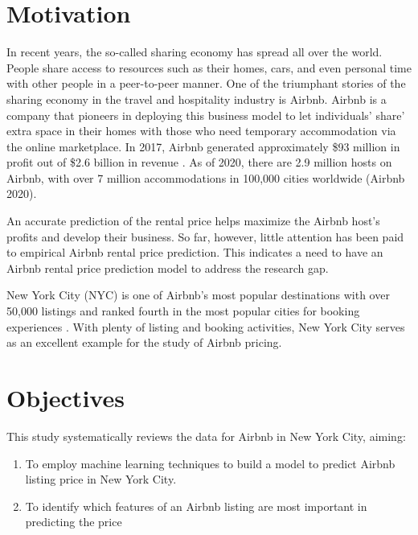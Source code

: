 \section{Motivation}
 \label{sec:motivation}

In recent years, the so-called sharing economy has spread all over the world.
People share access to resources such as their homes, cars, and even personal
time with other people in a peer-to-peer manner. One of the triumphant stories
of the sharing economy in the travel and hospitality industry is Airbnb. Airbnb
is a company that pioneers in deploying this business model to let individuals'
share' extra space in their homes with those who need temporary accommodation
via the online marketplace. In 2017, Airbnb generated approximately \$93 million
in profit out of \$2.6 billion in revenue \parencite{zaleski2018}.  As of 2020,
there are 2.9 million hosts on Airbnb, with over 7 million accommodations in
100,000 cities worldwide (Airbnb 2020).

An accurate prediction of the rental price helps maximize the Airbnb host's
profits and develop their business. So far, however, little attention has been
paid to empirical Airbnb rental price prediction. This indicates a need to have
an Airbnb rental price prediction model to address the research gap.

New York City (NYC) is one of Airbnb's most popular destinations with over
50,000 listings and ranked fourth in the most popular cities for booking
experiences \parencite{airbnbfacts}. With plenty of listing and booking
activities, New York City serves as an excellent example for the study of Airbnb
pricing.

\section{Objectives}
\label{sec:objectives}

This study systematically reviews the data for Airbnb in New York City, aiming:
\begin{enumerate}
  \item To employ machine learning techniques to build a model to predict Airbnb
    listing price in New York City.
  \item To identify which features of an Airbnb listing are most important  in
predicting the price
\end{enumerate}

